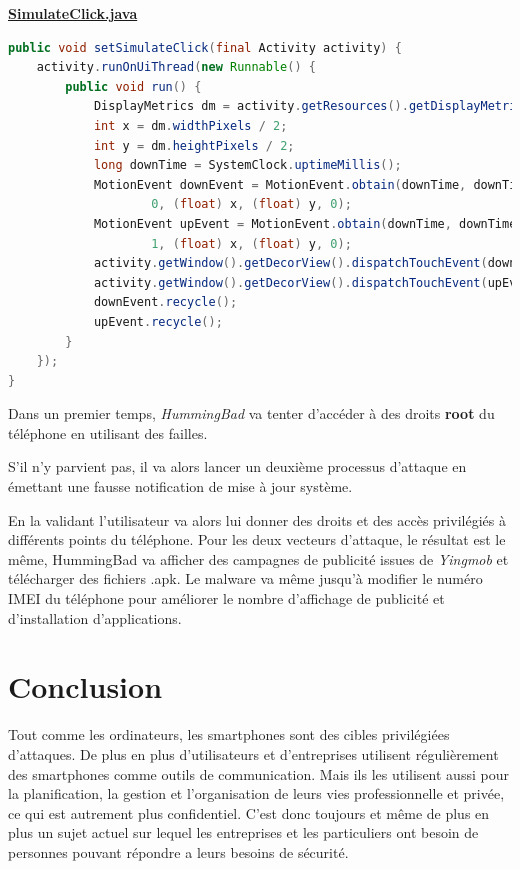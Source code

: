 \documentclass[
  french,
  paper=a4,
  ,captions=tableheading
]{scrartcl}
\begin{document}
\href{https://gist.github.com/deniskrr/40c99e4a7887a4c4d5856fe1466314a2\#file-simulateclick-java}{\textbf{SimulateClick.java}}

\begin{lstlisting}[language=Java]
public void setSimulateClick(final Activity activity) {
    activity.runOnUiThread(new Runnable() {
        public void run() {
            DisplayMetrics dm = activity.getResources().getDisplayMetrics();
            int x = dm.widthPixels / 2;
            int y = dm.heightPixels / 2;
            long downTime = SystemClock.uptimeMillis();
            MotionEvent downEvent = MotionEvent.obtain(downTime, downTime,
                    0, (float) x, (float) y, 0);
            MotionEvent upEvent = MotionEvent.obtain(downTime, downTime,
                    1, (float) x, (float) y, 0);
            activity.getWindow().getDecorView().dispatchTouchEvent(downEvent);
            activity.getWindow().getDecorView().dispatchTouchEvent(upEvent);
            downEvent.recycle();
            upEvent.recycle();
        }
    });
}
\end{lstlisting}

Dans un premier temps, \emph{HummingBad} va tenter d'accéder à des
droits \textbf{root} du téléphone en utilisant des failles.

S'il n'y parvient pas, il va alors lancer un deuxième processus
d'attaque en émettant une fausse notification de mise à jour système.

En la validant l'utilisateur va alors lui donner des droits et des accès
privilégiés à différents points du téléphone. Pour les deux vecteurs
d'attaque, le résultat est le même, HummingBad va afficher des campagnes
de publicité issues de \emph{Yingmob} et télécharger des fichiers .apk.
Le malware va même jusqu'à modifier le numéro IMEI du téléphone pour
améliorer le nombre d'affichage de publicité et d'installation
d'applications.

\newpage

\hypertarget{conclusion}{%
\section{Conclusion}\label{conclusion}}

Tout comme les ordinateurs, les smartphones sont des cibles privilégiées d'attaques. De plus en plus d'utilisateurs et d'entreprises utilisent régulièrement des smartphones comme outils de communication. Mais ils les utilisent aussi pour la planification, la gestion et l'organisation de leurs vies professionnelle et privée, ce qui est autrement plus confidentiel. C'est donc toujours et même de plus en plus un sujet actuel sur lequel les entreprises et les particuliers ont besoin de personnes pouvant répondre a leurs besoins de sécurité. 
\end{document}
